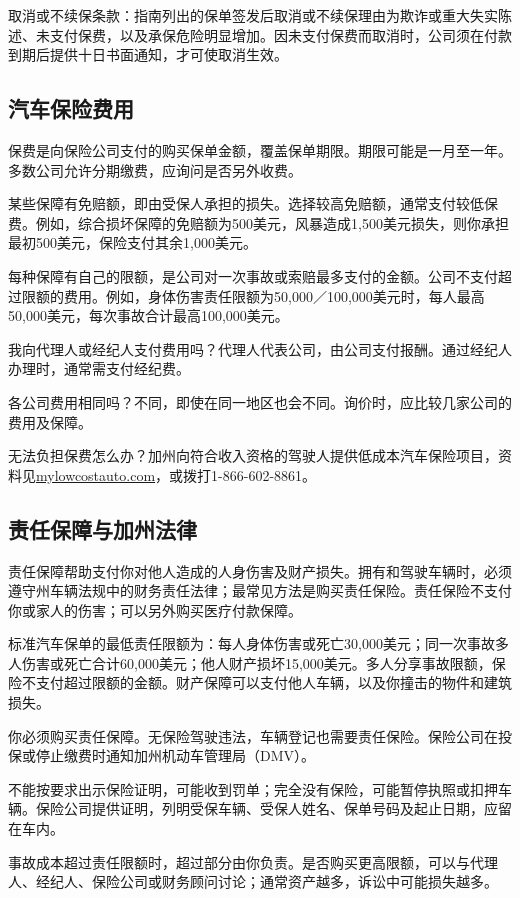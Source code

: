\documentclass[UTF8,fontset=none,11pt,a4paper]{ctexart}
\begin{document}
取消或不续保条款：指南列出的保单签发后取消或不续保理由为欺诈或重大失实陈述、未支付保费，以及承保危险明显增加。因未支付保费而取消时，公司须在付款到期后提供十日书面通知，才可使取消生效。


\subsection*{汽车保险费用}
保费是向保险公司支付的购买保单金额，覆盖保单期限。期限可能是一月至一年。多数公司允许分期缴费，应询问是否另外收费。


某些保障有免赔额，即由受保人承担的损失。选择较高免赔额，通常支付较低保费。例如，综合损坏保障的免赔额为500美元，风暴造成1,500美元损失，则你承担最初500美元，保险支付其余1,000美元。


每种保障有自己的限额，是公司对一次事故或索赔最多支付的金额。公司不支付超过限额的费用。例如，身体伤害责任限额为50,000／100,000美元时，每人最高50,000美元，每次事故合计最高100,000美元。


我向代理人或经纪人支付费用吗？代理人代表公司，由公司支付报酬。通过经纪人办理时，通常需支付经纪费。


各公司费用相同吗？不同，即使在同一地区也会不同。询价时，应比较几家公司的费用及保障。


无法负担保费怎么办？加州向符合收入资格的驾驶人提供低成本汽车保险项目，资料见\url{mylowcostauto.com}，或拨打1-866-602-8861。


\subsection*{责任保障与加州法律}
责任保障帮助支付你对他人造成的人身伤害及财产损失。拥有和驾驶车辆时，必须遵守州车辆法规中的财务责任法律；最常见方法是购买责任保险。责任保险不支付你或家人的伤害；可以另外购买医疗付款保障。


标准汽车保单的最低责任限额为：每人身体伤害或死亡30,000美元；同一次事故多人伤害或死亡合计60,000美元；他人财产损坏15,000美元。多人分享事故限额，保险不支付超过限额的金额。财产保障可以支付他人车辆，以及你撞击的物件和建筑损失。


你必须购买责任保障。无保险驾驶违法，车辆登记也需要责任保险。保险公司在投保或停止缴费时通知加州机动车管理局（DMV）。


不能按要求出示保险证明，可能收到罚单；完全没有保险，可能暂停执照或扣押车辆。保险公司提供证明，列明受保车辆、受保人姓名、保单号码及起止日期，应留在车内。


事故成本超过责任限额时，超过部分由你负责。是否购买更高限额，可以与代理人、经纪人、保险公司或财务顾问讨论；通常资产越多，诉讼中可能损失越多。
\end{document}
